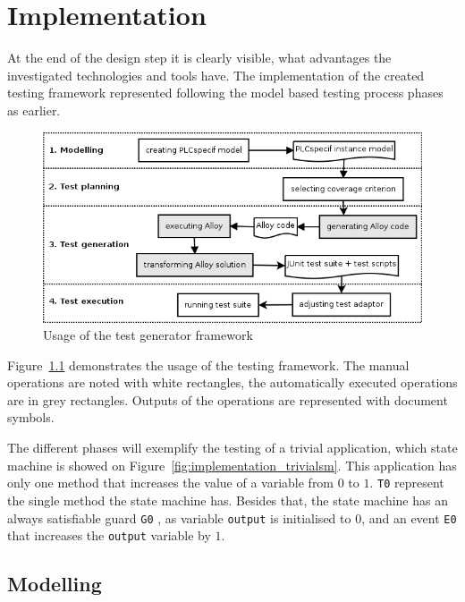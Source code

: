\chapter{Implementation}
\label{cha:implementation}

At the end of the design step it is clearly visible, what advantages the investigated technologies and tools have. The implementation of the created testing framework represented following the model based testing process phases as earlier.

\begin{figure}[htp]
\centering
\includegraphics[scale=0.6]{figures/implementation_usage}
\caption{Usage of the test generator framework}
\label{fig:implementation_usage}
\end{figure}

Figure~\ref{fig:implementation_usage} demonstrates the usage of the testing framework. The manual operations are noted with white rectangles, the automatically executed operations are in grey rectangles. Outputs of the operations are represented with document symbols.

The different phases will exemplify the testing of a trivial application, which state machine is showed on Figure~\ref{fig:implementation_trivialsm}. This application has only one method that increases the value of a variable from $0$ to $1$. \texttt{T0} represent the single method the state machine has. Besides that, the state machine has an always satisfiable guard \texttt{G0} , as variable \texttt{output} is initialised to $0$, and an event \texttt{E0} that increases the \texttt{output} variable by $1$. 

\section{Modelling}
\label{sec:implementationmodelling}

